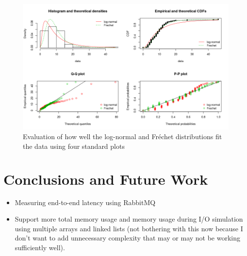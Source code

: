 \documentclass{article}
\begin{document}
\begin{figure}
  \centering
  \includegraphics[width=\textwidth]{../plots/cpu_time_distributions.png}
  \caption{Evaluation of how well the log-normal and Fr\'{e}chet distributions fit
    the data using four standard plots}
  \label{fig:frechet_fit}
\end{figure}


\section{Conclusions and Future Work} \label{sec:conclusions}

\begin{itemize}
\item Measuring end-to-end latency using RabbitMQ
\item Support more total memory usage and memory usage during I/O simulation
  using multiple arrays and linked lists (not bothering with this now because I
  don't want to add unnecessary complexity that may or may not be working
  sufficiently well).
\end{itemize}



\end{document}
